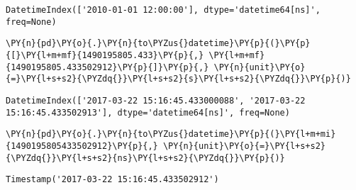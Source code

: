             \begin{tcolorbox}[breakable, size=fbox, boxrule=.5pt, pad at break*=1mm, opacityfill=0]
\begin{Verbatim}[commandchars=\\\{\}]
DatetimeIndex(['2010-01-01 12:00:00'], dtype='datetime64[ns]', freq=None)
\end{Verbatim}
\end{tcolorbox}
        
    \begin{tcolorbox}[breakable, size=fbox, boxrule=1pt, pad at break*=1mm,colback=cellbackground, colframe=cellborder]
\begin{Verbatim}[commandchars=\\\{\}]
\PY{n}{pd}\PY{o}{.}\PY{n}{to\PYZus{}datetime}\PY{p}{(}\PY{p}{[}\PY{l+m+mf}{1490195805.433}\PY{p}{,} \PY{l+m+mf}{1490195805.433502912}\PY{p}{]}\PY{p}{,} \PY{n}{unit}\PY{o}{=}\PY{l+s+s2}{\PYZdq{}}\PY{l+s+s2}{s}\PY{l+s+s2}{\PYZdq{}}\PY{p}{)}
\end{Verbatim}
\end{tcolorbox}

            \begin{tcolorbox}[breakable, size=fbox, boxrule=.5pt, pad at break*=1mm, opacityfill=0]
\begin{Verbatim}[commandchars=\\\{\}]
DatetimeIndex(['2017-03-22 15:16:45.433000088', '2017-03-22
15:16:45.433502913'], dtype='datetime64[ns]', freq=None)
\end{Verbatim}
\end{tcolorbox}
        
    \begin{tcolorbox}[breakable, size=fbox, boxrule=1pt, pad at break*=1mm,colback=cellbackground, colframe=cellborder]
\begin{Verbatim}[commandchars=\\\{\}]
\PY{n}{pd}\PY{o}{.}\PY{n}{to\PYZus{}datetime}\PY{p}{(}\PY{l+m+mi}{1490195805433502912}\PY{p}{,} \PY{n}{unit}\PY{o}{=}\PY{l+s+s2}{\PYZdq{}}\PY{l+s+s2}{ns}\PY{l+s+s2}{\PYZdq{}}\PY{p}{)}
\end{Verbatim}
\end{tcolorbox}

            \begin{tcolorbox}[breakable, size=fbox, boxrule=.5pt, pad at break*=1mm, opacityfill=0]
\begin{Verbatim}[commandchars=\\\{\}]
Timestamp('2017-03-22 15:16:45.433502912')
\end{Verbatim}
\end{tcolorbox}
